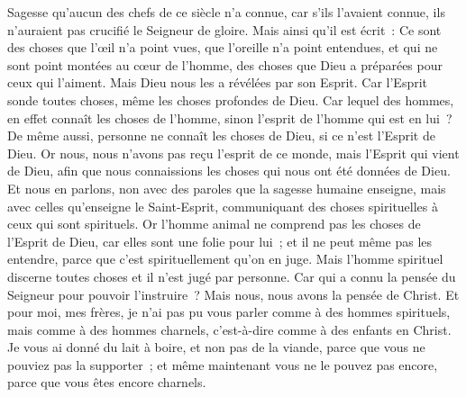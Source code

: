 \begin{multicols}{2}
Sagesse qu'aucun des chefs de ce siècle n'a connue, car s'ils l'avaient connue, ils n'auraient pas crucifié le Seigneur de gloire.
Mais ainsi qu'il est écrit~: Ce sont des choses que l'œil n'a point vues, que l'oreille n'a point entendues, et qui ne sont point montées au cœur de l'homme, des choses que Dieu a préparées pour ceux qui l'aiment.
Mais Dieu nous les a révélées par son Esprit. Car l'Esprit sonde toutes choses, même les choses profondes de Dieu.
Car lequel des hommes, en effet connaît les choses de l'homme, sinon l'esprit de l'homme qui est en lui~? De même aussi, personne ne connaît les choses de Dieu, si ce n'est l'Esprit de Dieu.
Or nous, nous n'avons pas reçu l'esprit de ce monde, mais l'Esprit qui vient de Dieu, afin que nous connaissions les choses qui nous ont été données de Dieu.
Et nous en parlons, non avec des paroles que la sagesse humaine enseigne, mais avec celles qu'enseigne le Saint-Esprit, communiquant des choses spirituelles à ceux qui sont spirituels.
Or l'homme animal ne comprend pas les choses de l'Esprit de Dieu, car elles sont une folie pour lui~; et il ne peut même pas les entendre, parce que c'est spirituellement qu'on en juge.
Mais l'homme spirituel discerne toutes choses et il n'est jugé par personne.
Car qui a connu la pensée du Seigneur pour pouvoir l'instruire~? Mais nous, nous avons la pensée de Christ.
\VerseOne{}Et pour moi, mes frères, je n'ai pas pu vous parler comme à des hommes spirituels, mais comme à des hommes charnels, c'est-à-dire comme à des enfants en Christ.
Je vous ai donné du lait à boire, et non pas de la viande, parce que vous ne pouviez pas la supporter~; et même maintenant vous ne le pouvez pas encore, parce que vous êtes encore charnels.

\end{multicols}
